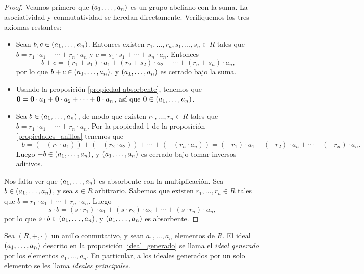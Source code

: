 \begin{proof}
Veamos primero que $\left( a_1, \dots, a_n \right)$ es un grupo abeliano con la suma. La asociatividad y conmutatividad se heredan directamente. Verifiquemos los tres axiomas restantes:
\begin{itemize}
\item Sean $b, c \in \left( a_1, \dots, a_n \right)$. Entonces existen $r_1, \dots, r_n, s_1, \dots, s_n \in R$ tales que $b = r_1 \cdot a_1 + \cdots + r_n \cdot a_n$ y $c = s_1 \cdot s_1 + \cdots + s_n \cdot a_n$. Entonces
$$b + c = (r_1 + s_1) \cdot a_1 + (r_2 + s_2) \cdot a_2 + \cdots + (r_n + s_n) \cdot a_n,$$
por lo que $b + c \in \left( a_1, \dots, a_n \right)$, y $\left( a_1, \dots, a_n \right)$ es cerrado bajo la suma.
\item Usando la proposición \ref{propiedad absorbente}, tenemos que $\mathbf{0} = \mathbf{0} \cdot a_1 + \mathbf{0} \cdot a_2 + \cdots + \mathbf{0} \cdot a_n$, así que $\mathbf{0} \in \left( a_1, \dots, a_n \right)$.
\item Sea $b \in \left( a_1, \dots, a_n \right)$, de modo que existen $r_1, \dots, r_n \in R$ tales que $b = r_1 \cdot a_1 + \cdots + r_n \cdot a_n$. Por la propiedad 1 de la proposición \ref{propiedades_anillos} tenemos que $$-b = ( - (r_1 \cdot a_1)) + ( - (r_2 \cdot a_2)) + \cdots + ( - (r_n \cdot a_n))= (-r_1) \cdot a_1 + (-r_2) \cdot a_n + \cdots + (-r_n) \cdot a_n.$$ Luego $-b \in \left( a_1, \dots, a_n \right)$, y $\left( a_1, \dots, a_n \right)$ es cerrado bajo tomar inversos aditivos.
\end{itemize} 
Nos falta ver que $\left( a_1, \dots, a_n \right)$ es absorbente con la multiplicación. Sea $b \in \left( a_1, \dots, a_n \right)$, y sea $s \in R$ arbitrario. Sabemos que existen $r_1, \dots, r_n \in R$ tales que $b = r_1 \cdot a_1 + \cdots + r_n \cdot a_n$. Luego
$$s \cdot b = (s \cdot r_1) \cdot a_1 + (s \cdot r_2) \cdot a_2 + \cdots + (s \cdot r_n) \cdot a_n,$$
por lo que $s \cdot b \in \left( a_1, \dots, a_n \right)$, y $\left( a_1, \dots, a_n \right)$ es absorbente. 
\end{proof}

\begin{definition}
Sea $(R, +, \cdot)$ un anillo conmutativo, y sean $a_1, \dots, a_n$ elementos de $R$. El ideal $\left( a_1, \dots, a_n \right)$ descrito en la proposición \ref{ideal_generado} se llama el \emph{ideal generado} por los elementos $a_1, \dots, a_n$. En particular, a los ideales generados por un solo elemento se les llama \emph{ideales principales}.
\end{definition}


